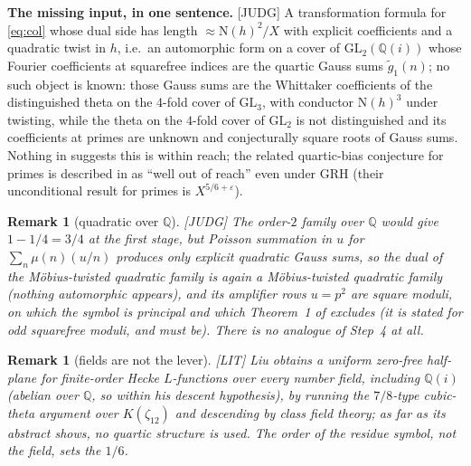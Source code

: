 \documentclass[11pt]{article}
\newtheorem{remark}[lemma]{Remark}
\newcommand{\N}{\mathrm N}
\newcommand{\Q}{\mathbb Q}
\begin{document}
\medskip\noindent\textbf{The missing input, in one sentence.} [JUDG] A transformation formula for \eqref{eq:col} whose dual side has length $\approx\N(h)^2/X$ with explicit coefficients and a quadratic twist in $h$, i.e.\ an automorphic form on a cover of $\mathrm{GL}_2(\Q(i))$ whose Fourier coefficients at squarefree indices are the quartic Gauss sums $\tilde g_1(n)$; no such object is known: those Gauss sums are the Whittaker coefficients of the distinguished theta on the $4$-fold cover of $\mathrm{GL}_3$, with conductor $\N(h)^3$ under twisting, while the theta on the $4$-fold cover of $\mathrm{GL}_2$ is not distinguished and its coefficients at primes are unknown and conjecturally square roots of Gauss sums. Nothing in \cite{DDHL,FG14b} suggests this is within reach; the related quartic-bias conjecture for primes is described in \cite{DDHL} as ``well out of reach'' even under GRH (their unconditional result for primes is $X^{5/6+\varepsilon}$).

\begin{remark}[quadratic over $\Q$]\label{rem:quad}
[JUDG] The order-$2$ family over $\Q$ would give $1-1/4=3/4$ at the first stage, but Poisson summation in $u$ for $\sum_n\mu(n)(u/n)$ produces only explicit quadratic Gauss sums, so the dual of the M\"obius-twisted quadratic family is again a M\"obius-twisted quadratic family (nothing automorphic appears), and its amplifier rows $u=p^2$ are square moduli, on which the symbol is principal and which Theorem~1 of \cite{HB95} excludes (it is stated for odd squarefree moduli, and must be). There is no analogue of Step~4 at all.
\end{remark}

\begin{remark}[fields are not the lever]
[LIT] Liu \cite{Liu26b} obtains a uniform zero-free half-plane for finite-order Hecke $L$-functions over every number field, including $\Q(i)$ (abelian over $\Q$, so within his descent hypothesis), by running the $7/8$-type cubic-theta argument over $K(\zeta_{12})$ and descending by class field theory; as far as its abstract shows, no quartic structure is used. The order of the residue symbol, not the field, sets the $1/6$.
\end{remark}
\end{document}
